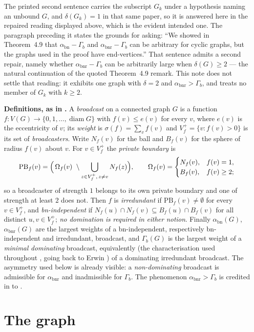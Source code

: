 \documentclass[11pt]{amsart}
\theoremstyle{remark}
\DeclareMathOperator{\bnr}{bnr}
\DeclareMathOperator{\bn}{bn}
\newcommand{\abnr}{\alpha_{\bnr}}
\newcommand{\abn}{\alpha_{\bn}}
\newcommand{\Gb}{\Gamma_{b}}
\newcommand{\PB}{\mathrm{PB}}
\begin{document}
\medskip
\noindent The printed second sentence carries the subscript $G_k$ under a
hypothesis naming an unbound $G$, and $\delta(G_k)=1$ in that same paper, so it
is answered here in the repaired reading displayed above, which is the evident
intended one. The paragraph preceding it states the grounds for asking:
``We showed in Theorem~4.9 that $\abn-\Gb$ and $\abnr-\Gb$ can be arbitrary for
cyclic graphs, but the graphs used in the proof have end-vertices.'' That
sentence admits a second repair, namely whether $\abnr-\Gb$ can be arbitrarily
large when $\delta(G)\ge2$ --- the natural continuation of the quoted
Theorem~4.9 remark. This note does not settle that reading: it exhibits one
graph with $\delta=2$ and $\abnr>\Gb$, and treats no member of $G_k$ with
$k\ge2$.

\medskip
\noindent\textbf{Definitions, as in \cite{MN24}.}
A \emph{broadcast} on a connected graph $G$ is a function
$f:V(G)\to\{0,1,\ldots,\operatorname{diam}G\}$ with $f(v)\le e(v)$ for every
$v$, where $e(v)$ is the eccentricity of $v$; its \emph{weight} is
$\sigma(f)=\sum_vf(v)$ and $V_f^{+}=\{v:f(v)>0\}$ is its set of
\emph{broadcasters}. Write $N_f(v)$ for the ball and $B_f(v)$ for the sphere of
radius $f(v)$ about $v$. For $v\in V_f^{+}$ the \emph{private boundary} is
\[
 \PB_f(v)=\Bigl(\,\Omega_f(v)\ \setminus \bigcup_{z\in V_f^{+},\,z\ne v}N_f(z)\Bigr),
 \qquad
 \Omega_f(v)=
 \begin{cases}
  N_f(v), & f(v)=1,\\
  B_f(v), & f(v)\ge2;
 \end{cases}
\]
so a broadcaster of strength $1$ belongs to its own private boundary and one of
strength at least $2$ does not. Then $f$ is \emph{irredundant} if
$\PB_f(v)\ne\emptyset$ for every $v\in V_f^{+}$, and \emph{bn-independent} if
$N_f(u)\cap N_f(v)\subseteq B_f(u)\cap B_f(v)$ for all distinct
$u,v\in V_f^{+}$; \emph{no domination is required in either notion}. Finally
$\abn(G)$, $\abnr(G)$ are the largest weights of a bn-independent, respectively
bn-independent and irredundant, broadcast, and $\Gb(G)$ is the largest weight of
a \emph{minimal dominating} broadcast, equivalently (the characterisation used
throughout \cite{MN24}, going back to Erwin \cite{Erwin}) of a dominating
irredundant broadcast. The asymmetry used below is already visible: a
\emph{non-dominating} broadcast is admissible for $\abnr$ and inadmissible for
$\Gb$. The phenomenon $\abnr>\Gb$ is credited in \cite{MN24} to \cite{Ne19}.

\section{The graph}
\end{document}
